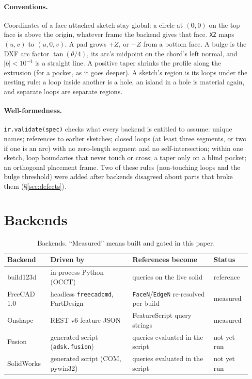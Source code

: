 \documentclass[11pt]{article}
\newcommand{\code}[1]{\texttt{\small #1}}
\begin{document}
\paragraph{Conventions.} Coordinates of a face-attached sketch stay global:
a circle at $(0,0)$ on the top face is above the origin, whatever frame the
backend gives that face. \code{XZ} maps $(u,v)$ to $(u,0,v)$. A pad grows
$+Z$, or $-Z$ from a bottom face. A bulge is the DXF arc factor $\tan(\theta/4)$,
its arc's midpoint on the chord's left normal, and $|b|<10^{-4}$ is a straight
line. A positive taper shrinks the profile along the extrusion (for a pocket,
as it goes deeper). A sketch's region is its loops under the nesting rule: a
loop inside another is a hole, an island in a hole is material again, and
separate loops are separate regions.

\paragraph{Well-formedness.} \code{ir.validate(spec)} checks what every backend
is entitled to assume: unique names; references to earlier sketches; closed
loops (at least three segments, or two if one is an arc) with no zero-length
segment and no self-intersection; within one sketch, loop boundaries that never
touch or cross; a taper only on a blind pocket; an orthogonal placement frame.
Two of these rules (non-touching loops and the bulge threshold) were added after
backends disagreed about parts that broke them (\S\ref{sec:defects}).

\section{Backends}\label{sec:backends}

\begin{table}[t]
\centering\small
\begin{tabular}{@{}llll@{}}
\toprule
Backend & Driven by & References become & Status \\
\midrule
build123d & in-process Python (OCCT) & queries on the live solid & reference \\
FreeCAD 1.0 & headless \code{freecadcmd}, PartDesign & \code{FaceN}/\code{EdgeN} re-resolved per build & measured \\
Onshape & REST v6 feature JSON & FeatureScript query strings & measured \\
Fusion & generated script (\code{adsk.fusion}) & queries evaluated in the script & not yet run \\
SolidWorks & generated script (COM, pywin32) & queries evaluated in the script & not yet run \\
\bottomrule
\end{tabular}
\caption{Backends. ``Measured'' means built and gated in this paper.}
\label{tab:backends}
\end{table}
\end{document}
